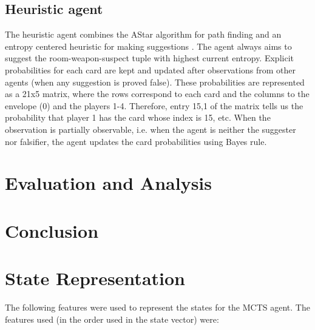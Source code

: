 \documentclass[msc, deptreport, ai, romanprepages]{infthesis}
\begin{document}
\section{Heuristic agent}
The heuristic agent combines the AStar algorithm for path finding and an entropy centered heuristic for making suggestions \cite{Russell-norvig}. The agent always aims to suggest the room-weapon-suspect tuple with highest current entropy. Explicit probabilities for each card are kept and updated after observations from other agents (when any suggestion is proved false). These probabilities are represented as a 21x5 matrix, where the rows correspond to each card and the columns to the envelope (0) and the players 1-4. Therefore, entry 15,1 of the matrix tells us the probability that player 1 has the card whose index is 15, etc. When the observation is partially observable, i.e. when the agent is neither the suggester nor falsifier, the agent updates the card probabilities using Bayes rule.

\chapter{Evaluation and Analysis}

\chapter{Conclusion}

\appendix
\chapter{State Representation}
The following features were used to represent the states for the MCTS agent. The features used (in the order used in the state vector) were:
\end{document}
